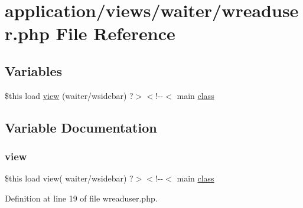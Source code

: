 \hypertarget{wreaduser_8php}{}\section{application/views/waiter/wreaduser.php File Reference}
\label{wreaduser_8php}
\subsection*{Variables}
\begin{DoxyCompactItemize}
\item 
\$this load \mbox{\hyperlink{wreaduser_8php_a3f75645b356759573f9a6e113f619a48}{view}} (\textquotesingle{}waiter/wsidebar\textquotesingle{}) ?$>$$<$!-\/-\/$<$ main \mbox{\hyperlink{waiter_2olaporan_8php_a185c73c6507391d1eb38c776b68ce96d}{class}}
\end{DoxyCompactItemize}


\subsection{Variable Documentation}
\mbox{\label{wreaduser_8php_a3f75645b356759573f9a6e113f619a48}} 
\subsubsection{\texorpdfstring{view}{view}}
{\footnotesize\ttfamily \$this load view( \textquotesingle{}waiter/wsidebar\textquotesingle{}) ?$>$$<$!-\/-\/$<$ main \mbox{\hyperlink{waiter_2olaporan_8php_a185c73c6507391d1eb38c776b68ce96d}{class}}}



Definition at line 19 of file wreaduser.\+php.

